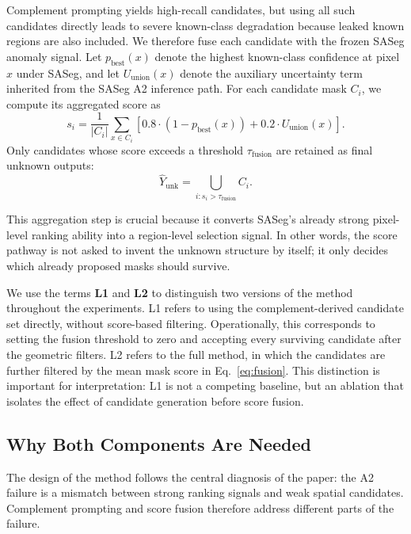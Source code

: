 \documentclass[a4paper,fleqn]{cas-dc}
\begin{document}
Complement prompting yields high-recall candidates, but using all such candidates directly leads to severe known-class degradation because leaked known regions are also included. We therefore fuse each candidate with the frozen SASeg anomaly signal. Let $p_{\text{best}}(x)$ denote the highest known-class confidence at pixel $x$ under SASeg, and let $U_{\text{union}}(x)$ denote the auxiliary uncertainty term inherited from the SASeg A2 inference path. For each candidate mask $C_i$, we compute its aggregated score as
\begin{equation}
s_i = \frac{1}{|C_i|} \sum_{x \in C_i} \left[0.8 \cdot \left(1 - p_{\text{best}}(x)\right) + 0.2 \cdot U_{\text{union}}(x)\right].
\label{eq:fusion}
\end{equation}
Only candidates whose score exceeds a threshold $\tau_{\text{fusion}}$ are retained as final unknown outputs:
\begin{equation}
\hat{Y}_{\text{unk}} = \bigcup_{i: s_i > \tau_{\text{fusion}}} C_i.
\end{equation}

This aggregation step is crucial because it converts SASeg's already strong pixel-level ranking ability into a region-level selection signal. In other words, the score pathway is not asked to invent the unknown structure by itself; it only decides which already proposed masks should survive.

We use the terms \textbf{L1} and \textbf{L2} to distinguish two versions of the method throughout the experiments. L1 refers to using the complement-derived candidate set directly, without score-based filtering. Operationally, this corresponds to setting the fusion threshold to zero and accepting every surviving candidate after the geometric filters. L2 refers to the full method, in which the candidates are further filtered by the mean mask score in Eq.~\eqref{eq:fusion}. This distinction is important for interpretation: L1 is not a competing baseline, but an ablation that isolates the effect of candidate generation before score fusion.

\subsection{Why Both Components Are Needed}
\label{sec:method:design}

The design of the method follows the central diagnosis of the paper: the A2 failure is a mismatch between strong ranking signals and weak spatial candidates. Complement prompting and score fusion therefore address different parts of the failure.
\end{document}

